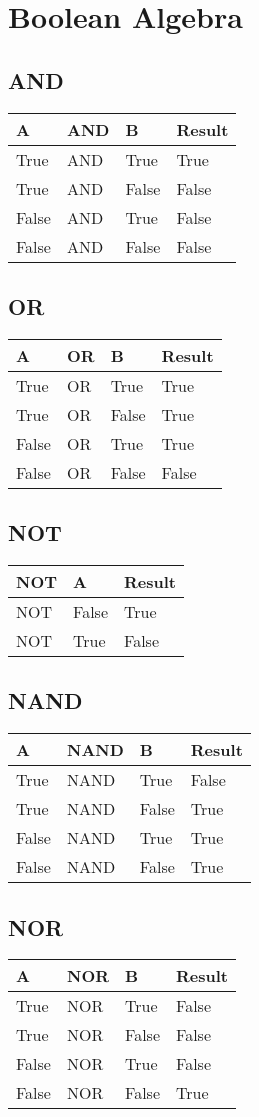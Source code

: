 \documentclass[11pt]{report}
\begin{document}
\section{Boolean Algebra}
\subsection{AND}
\begin{tabular}{lll|l}
A & AND & B & Result \\
\hline
True & AND & True & True \\
True & AND & False & False \\
False & AND & True & False \\
False & AND & False & False \\
\hline
\end{tabular}

\subsection{OR}
\begin{tabular}{lll|l}
A & OR &B & Result \\
\hline
True & OR & True & True \\
True & OR & False & True \\
False & OR & True & True \\
False & OR & False & False \\
\hline
\end{tabular}

\subsection{NOT}
\begin{tabular}{ll|l}
NOT & A & Result \\
\hline
NOT & False & True \\
NOT & True & False \\

\hline
\end{tabular}


\subsection{NAND}
\begin{tabular}{lll|l}
A & NAND & B & Result \\
\hline
True & NAND & True & False \\
True & NAND & False & True \\
False & NAND & True & True \\
False & NAND & False & True \\
\hline
\end{tabular}

\subsection{NOR}
\begin{tabular}{lll|l}
A & NOR & B & Result \\
\hline
True & NOR & True & False \\
True & NOR & False & False \\
False & NOR & True & False \\
False & NOR & False & True \\
\hline
\end{tabular}





\end{document}
